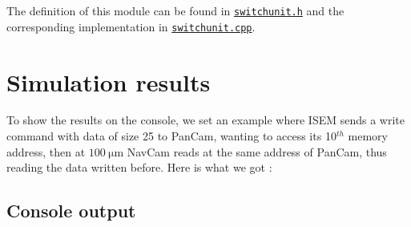 \documentclass[12pt,a4paper]{article}
\begin{document}
The definition of this module can be found in \href{https://github.com/suai-ipsa2018/ExoMars2020/blob/master/ExoMars2020/Network/switchunit.h}{\texttt{switchunit.h}} and the corresponding implementation in \href{https://github.com/suai-ipsa2018/ExoMars2020/blob/master/ExoMars2020/Network/switchunit.cpp}{\texttt{switchunit.cpp}}.
\pagebreak

\section{Simulation results}

To show the results on the console, we set an example where ISEM sends a write command with data of size 25 to PanCam, wanting to access its 10$^{th}$ memory address, then at $\SI{100}{\micro\meter}$ NavCam reads at the same address of PanCam, thus reading the data written before. Here is what we got : \smallbreak

\subsection{Console output}
\end{document}
